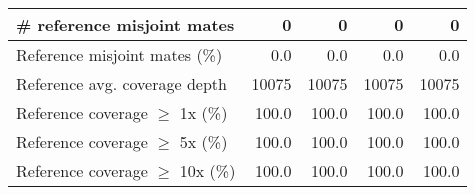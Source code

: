 \documentclass[12pt,a4paper]{article}
\begin{document}
\begin{table}[ht]
\begin{center}
\begin{tabular}{|l*{4}{|r}|}
\# reference misjoint mates & 0 & 0 & 0 & 0 \\ \hline
Reference misjoint mates (\%) & 0.0 & 0.0 & 0.0 & 0.0 \\ \hline
Reference avg. coverage depth & 10075 & 10075 & 10075 & 10075 \\ \hline
Reference coverage $\geq$ 1x (\%) & 100.0 & 100.0 & 100.0 & 100.0 \\ \hline
Reference coverage $\geq$ 5x (\%) & 100.0 & 100.0 & 100.0 & 100.0 \\ \hline
Reference coverage $\geq$ 10x (\%) & 100.0 & 100.0 & 100.0 & 100.0 \\ \hline
\end{tabular}
\end{center}
\end{table}
\end{document}
